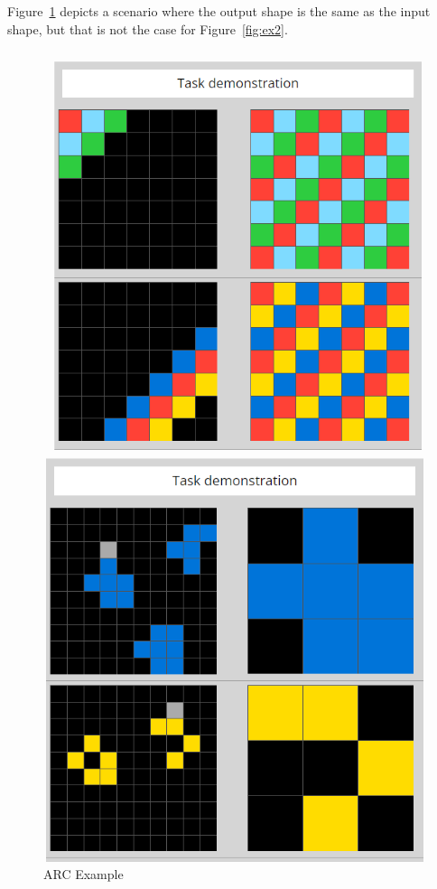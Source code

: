 \documentclass[letterpaper]{article} %
\begin{document}
Figure~\ref{fig:ex1} depicts a scenario where the output shape is the same as the input shape, but that is not the case for Figure~\ref{fig:ex2}.

\begin{figure}[htbp]
    \centering
    \begin{minipage}{0.22\textwidth}
        \centering
        \includegraphics[width=\textwidth]{ex1.png}
        \caption{ARC Example}
        \label{fig:ex1}
    \end{minipage}
    \hfill
    \begin{minipage}{0.22\textwidth}
        \centering
        \includegraphics[width=\textwidth]{ex2.png}

\end{minipage}
\end{figure}
\end{document}
